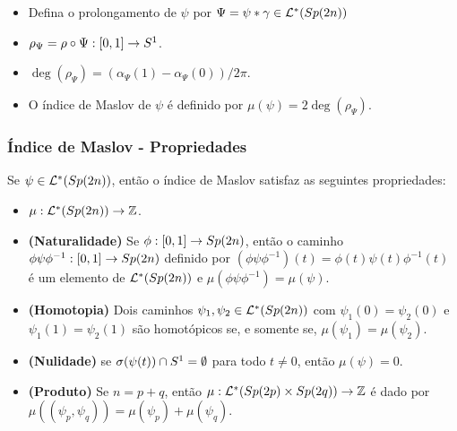 \documentclass{beamer}
\begin{document}
\begin{footnotesize}
\begin{frame}
\begin{scriptsize}
\begin{definicao}
\begin{itemize}
					\item Defina o prolongamento de $\psi$ por $\Psi = \psi*\gamma \in   \mathcal{L}^{*}(Sp(2n))$ 
					
					\item $\rho_{\Psi} = \rho \circ \Psi:[0,1]\to S^{1}$.
					
					\item $\deg(\rho_{\Psi}) = (\alpha_{\Psi}(1)-\alpha_{\Psi}(0))/2\pi$. 
					
					\item 	O índice de Maslov de $\psi$ é definido por
					$\mu(\psi)= 2\deg(\rho_{\Psi})$.
				\end{itemize}
			\end{definicao}
		\end{scriptsize}
		
		\end{frame}
	
	
	\begin{frame}			
		\frametitle{Índice de Maslov - Propriedades}
		
		\begin{teorema}
			Se $\psi \in \mathcal{L}^{*}(Sp(2n))$, então o índice de Maslov satisfaz as seguintes propriedades:
			\begin{itemize}
				\item $\mu:\mathcal{L}^{*}(Sp(2n)) \to \mathbb{Z}$.
				
				\item \textbf{(Naturalidade)}\label{item_naturalidade_maslov} Se $\phi:[0,1]
				\to Sp(2n)$, então o caminho $\phi\psi\phi^{-1}: [0,1] \to Sp(2n)$ definido por $(\phi\psi\phi^{-1})(t) = \phi(t)\psi(t)\phi^{-1}(t)$ é um elemento de $\mathcal{L}^{*}(Sp(2n))$ e $\mu(\phi\psi\phi^{-1}) = \mu(\psi)$.
				
				\item \textbf{(Homotopia)} \label{item_homotopia_caminhos_teorema_indice_maslov} Dois caminhos $\psi_{1}, \psi_{2}\in \mathcal{L}^{*}(Sp(2n)) $ com $\psi_{1}(0) = \psi_{2}(0)$ e $\psi_{1}(1) = \psi_{2}(1)$ são homotópicos se, e somente se, $\mu(\psi_{1}) = \mu(\psi_{2})$.
				
				\item \textbf{(Nulidade)} se $\sigma(\psi(t))\cap S^{1} = \emptyset$ para todo $t\neq 0$, então $\mu(\psi) = 0$.
				
					\item \textbf{(Produto)} Se $n=p+q$, então  $\mu:\mathcal{L}^{*}(Sp(2p)\times Sp(2q)) \to \mathbb{Z}$ é dado por $\mu((\psi_{p}, \psi_{q})) = \mu(\psi_{p})+\mu(\psi_{q})$.
			\end{itemize}
		\end{teorema}
	\end{frame}
	

\end{footnotesize}
\end{document}
